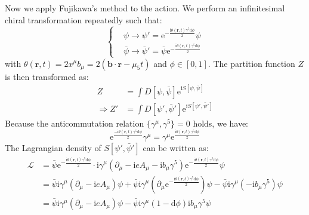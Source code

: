 Now we apply Fujikawa's method to the action. We perform an infinitesimal chiral transformation repeatedly such that:
\begin{equation}
\left\{
\begin{aligned}
& \psi \to \psi' = \mathrm{e}^{-\frac{\mathrm{i}\theta(\bm{r},t)\gamma^5 \mathrm{d}\phi}{2}} \psi \\
& \bar{\psi} \to \bar{\psi}' = \bar{\psi} \mathrm{e}^{-\frac{\mathrm{i}\theta(\bm{r},t)\gamma^5 \mathrm{d}\phi}{2}}
\end{aligned}
\right.
\end{equation}
with $\theta(\bm{r},t) = 2 x^\mu b_\mu = 2(\bm{b} \cdot \bm{r} - \mu_5 t)$ and $\phi \in [0, 1]$. The partition function $Z$ is then transformed as:
\begin{equation}
\begin{aligned}
Z &= \int D[\psi, \bar{\psi}] \mathrm{e}^{\mathrm{i}S[\psi, \bar{\psi}]} \\
\Rightarrow Z' &= \int D[\psi', \bar{\psi}'] \mathrm{e}^{\mathrm{i}S[\psi', \bar{\psi}']}
\end{aligned}
\end{equation}
Because the anticommutation relation $\{\gamma^\mu, \gamma^5\} = 0$ holds, we have:
\begin{equation}
\mathrm{e}^{\frac{-\mathrm{i}\theta(\bm{r},t)\gamma^5 \mathrm{d}\phi}{2}} \gamma^\mu = \gamma^\mu \mathrm{e}^{\frac{\mathrm{i}\theta(\bm{r},t)\gamma^5 \mathrm{d}\phi}{2}}
\end{equation}
The Lagrangian density of $S[\psi', \bar{\psi}']$ can be written as:
\begin{equation}
\begin{aligned}
\mathcal{L} &= \bar{\psi} \mathrm{e}^{-\frac{\mathrm{i}\theta(\bm{r},t)\gamma^5 \mathrm{d}\phi}{2}} \cdot \mathrm{i} \gamma^\mu (\partial_\mu - \mathrm{i} e A_\mu - \mathrm{i} b_\mu \gamma^5) \mathrm{e}^{-\frac{\mathrm{i}\theta(\bm{r},t)\gamma^5 \mathrm{d}\phi}{2}} \psi \\
&= \bar{\psi} \mathrm{i} \gamma^\mu (\partial_\mu - \mathrm{i} e A_\mu) \psi + \bar{\psi} \mathrm{i} \gamma^\mu (\partial_\mu \mathrm{e}^{-\frac{\mathrm{i}\theta(\bm{r},t)\gamma^5 \mathrm{d}\phi}{2}}) \psi - \bar{\psi} \mathrm{i} \gamma^\mu (-\mathrm{i} b_\mu \gamma^5) \psi \\
&= \bar{\psi} \mathrm{i} \gamma^\mu (\partial_\mu - \mathrm{i} e A_\mu) \psi - \bar{\psi} \mathrm{i} \gamma^\mu (1 - \mathrm{d}\phi) \mathrm{i} b_\mu \gamma^5 \psi
\end{aligned}
\end{equation}
